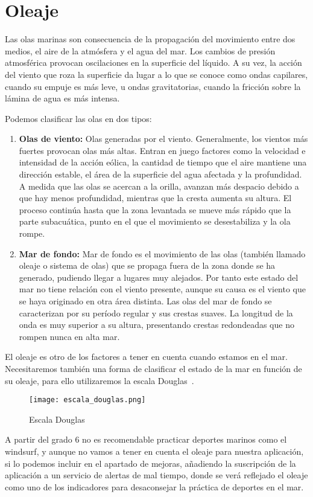 \section{Oleaje}


Las olas marinas son consecuencia de la propagación del movimiento entre dos medios, el aire de la
atmósfera y el agua del mar. Los cambios de presión atmosférica provocan oscilaciones en la
superficie del líquido. A su vez, la acción del viento que roza la superficie da lugar a lo que se
conoce como ondas capilares, cuando su empuje es más leve, u ondas gravitatorias, cuando la
fricción sobre la lámina de agua es más intensa.

Podemos clasificar las olas en dos tipos:

\begin{enumerate}
\item \textbf{Olas de viento: }
Olas generadas por el viento. Generalmente, los vientos más fuertes provocan olas más altas.
 Entran en juego factores como la velocidad e intensidad de la acción eólica, la cantidad de 
tiempo que el aire mantiene una dirección estable, el área de la superficie del agua afectada
 y la profundidad. A medida que las olas se acercan a la orilla, avanzan más despacio debido
 a que hay menos profundidad, mientras que la cresta aumenta su altura. El proceso continúa 
hasta que la zona levantada se mueve más rápido que la parte subacuática, punto en el que 
el movimiento se desestabiliza y la ola rompe.

 \item \textbf{Mar de fondo: } 
Mar de fondo es el movimiento de las olas (también llamado oleaje o sistema de olas) que se 
propaga fuera de la zona donde se ha generado, pudiendo llegar a lugares muy alejados. 
Por tanto este estado del mar no tiene relación con el viento presente, aunque su causa es el
 viento que se haya originado en otra área distinta. Las olas del mar de fondo se caracterizan
 por su período regular y sus crestas suaves. La longitud de la onda es muy superior a su altura, 
presentando crestas redondeadas que no rompen nunca en alta mar.

\end{enumerate}


El oleaje es otro de los factores a tener en cuenta cuando estamos en el mar. 
Necesitaremos también una forma de clasificar el estado de la mar en función de su oleaje,
 para ello utilizaremos la escala Douglas~\cite{DOUGLAS}.


\begin{figure}[hb]
\texttt{[image: escala\_douglas.png]} 
\caption{Escala Douglas}
\end{figure}

A partir del grado 6 no es recomendable practicar deportes marinos como el windsurf, 
y aunque no vamos a tener en cuenta el oleaje para nuestra aplicación, si lo podemos
 incluir en el apartado de mejoras, añadiendo la suscripción de la aplicación a un servicio 
de alertas de mal tiempo, donde se verá reflejado el oleaje como uno de los indicadores
 para desaconsejar la práctica de deportes en el mar. 

